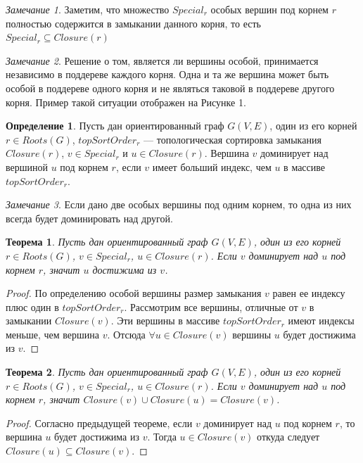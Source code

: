 \documentclass[12pt,a4paper,oneside]{article}
\newtheorem{theorem}{Теорема}
\theoremstyle{definition}
\newtheorem{definition}{Определение}[]
\theoremstyle{lemma}
\theoremstyle{remark}
\newtheorem{remark}{Замечание}[]
\begin{document}
\begin{remark}
Заметим, что множество $Special_r$ особых вершин под корнем $r$ полностью содержится в замыкании данного корня, то есть $Special_r \subseteq Closure(r)$
\end{remark}

\begin{remark}
Решение о том, является ли вершины особой, принимается независимо в поддереве каждого корня. Одна и та же вершина может быть особой в поддереве одного корня и не являться таковой в поддереве другого корня. Пример такой ситуации отображен на Рисунке 1.
\end{remark}

\begin{definition}
Пусть дан ориентированный граф $G(V,E)$, один из его корней $r \in Roots(G)$, $topSortOrder_r$ --- топологическая сортировка замыкания $Closure(r)$, $v \in Special_r$ и $u \in Closure(r)$. Вершина $v$ доминирует над вершиной $u$ под корнем $r$, если $v$ имеет больший индекс, чем $u$ в массиве $topSortOrder_r$.
\end{definition}

\begin{remark}
Если дано две особых вершины под одним корнем, то одна из них всегда будет доминировать над другой.
\end{remark}

\begin{theorem}
Пусть дан ориентированный граф $G(V,E)$, один из его корней $r \in Roots(G)$, $v \in Special_r$, $u \in Closure(r)$. Если $v$ доминирует над $u$ под корнем $r$, значит $u$ достижима из $v$.
\end{theorem}

\begin{proof}
По определению особой вершины размер замыкания $v$ равен ее индексу плюс один в $topSortOrder_r$.
Рассмотрим все вершины, отличные от $v$ в замыкании $Closure(v)$.
Эти вершины в массиве $topSortOrder_r$ имеют индексы меньше, чем вершина $v$. Отсюда $\forall u \in Closure(v)$ вершины $u$ будет достижима из $v$.
\end{proof}

\begin{theorem}
Пусть дан ориентированный граф $G(V,E)$, один из его корней $r \in Roots(G)$, $v \in Special_r$, $u \in Closure(r)$. Если $v$ доминирует над $u$ под корнем $r$, значит $Closure(v) \cup Closure(u) = Closure(v)$.
\end{theorem}

\begin{proof}
Согласно предыдущей теореме, если $v$ доминирует над $u$ под корнем $r$, то вершина $u$ будет достижима из $v$. Тогда $u \in Closure(v)$ откуда следует $Closure(u) \subseteq Closure(v)$.
\end{proof}
\end{document}
